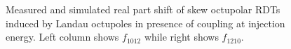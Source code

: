\begin{figure}[!htb]
\begin{subfigure}{0.47\textwidth}
    \end{subfigure}
    \caption{Measured and simulated real part shift of skew octupolar RDTs induced by Landau
    octupoles in presence of coupling at injection energy. Left column shows $f_{1012}$ while right
    shows $f_{1210}$.}
    \label{fig:skew_octupolar:response_meas_sim_coupling}
\end{figure}





\FloatBarrier
\section{}